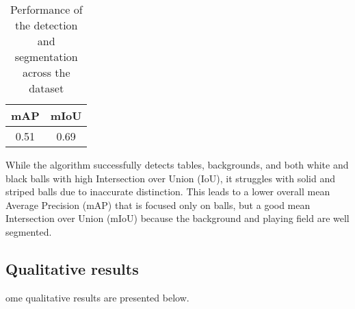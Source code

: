 \begin{table}[H]
	\centering
	\begin{tabular}{|c|c|}
		\hline
		\textbf{mAP} & \textbf{mIoU} \\
		\hline
		0.51 & 0.69 \\
		\hline
	\end{tabular}
	\caption{Performance of the detection and segmentation across the dataset}
	\label{tab: performance across dataset}
\end{table}


While the algorithm successfully detects tables, backgrounds, and both white and black balls with high Intersection over Union (IoU), it struggles with solid and striped balls due to inaccurate distinction. %
This leads to a lower overall mean Average Precision (mAP) that is focused only on balls, but a good mean Intersection over Union (mIoU) because the background and playing field are well segmented.

\subsection{Qualitative results}
ome qualitative results are presented below.



